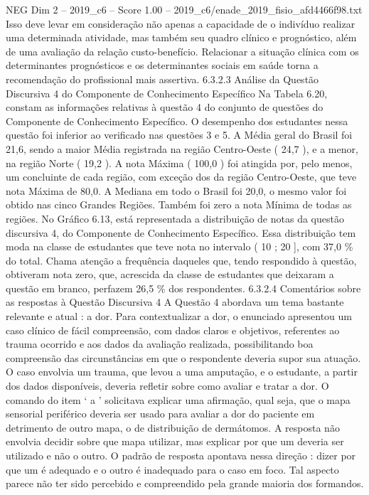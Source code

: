 \begin{textsample}{NEG Dim 2 – 2019\_c6 – Score 1.00 – 2019\_c6/enade\_2019\_fisio\_afd4466f98.txt}
Isso deve levar em consideração não apenas a capacidade de o indivíduo realizar uma determinada atividade, mas também seu quadro clínico e prognóstico, além de uma avaliação da relação custo-benefício.
Relacionar a situação clínica com os determinantes prognósticos e os determinantes sociais em saúde torna a recomendação do profissional mais assertiva. 6.3.2.3 Análise da Questão Discursiva 4 do Componente de Conhecimento Específico Na Tabela 6.20, constam as informações relativas à questão 4 do conjunto de questões do Componente de Conhecimento Específico.
O desempenho dos estudantes nessa questão foi inferior ao verificado nas questões 3 e 5.
A Média geral do Brasil foi 21,6, sendo a maior Média registrada na região Centro-Oeste ( 24,7 ), e a menor, na região Norte ( 19,2 ).
A nota Máxima ( 100,0 ) foi atingida por, pelo menos, um concluinte de cada região, com exceção dos da região Centro-Oeste, que teve nota Máxima de 80,0.
A Mediana em todo o Brasil foi 20,0, o mesmo valor foi obtido nas cinco Grandes Regiões.
Também foi zero a nota Mínima de todas as regiões.
No Gráfico 6.13, está representada a distribuição de notas da questão discursiva 4, do Componente de Conhecimento Específico.
Essa distribuição tem moda na classe de estudantes que teve nota no intervalo ( 10 ; 20 ], com 37,0 \% do total.
Chama atenção a frequência daqueles que, tendo respondido à questão, obtiveram nota zero, que, acrescida da classe de estudantes que deixaram a questão em branco, perfazem 26,5 \% dos respondentes. 6.3.2.4 Comentários sobre as respostas à Questão Discursiva 4 A Questão 4 abordava um tema bastante relevante e atual : a dor.
Para contextualizar a dor, o enunciado apresentou um caso clínico de fácil compreensão, com dados claros e objetivos, referentes ao trauma ocorrido e aos dados da avaliação realizada, possibilitando boa compreensão das circunstâncias em que o respondente deveria supor sua atuação.
O caso envolvia um trauma, que levou a uma amputação, e o estudante, a partir dos dados disponíveis, deveria refletir sobre como avaliar e tratar a dor.
O comando do item ‘ a ’ solicitava explicar uma afirmação, qual seja, que o mapa sensorial periférico deveria ser usado para avaliar a dor do paciente em detrimento de outro mapa, o de distribuição de dermátomos.
A resposta não envolvia decidir sobre que mapa utilizar, mas explicar por que um deveria ser utilizado e não o outro.
O padrão de resposta apontava nessa direção : dizer por que um é adequado e o outro é inadequado para o caso em foco.
Tal aspecto parece não ter sido percebido e compreendido pela grande maioria dos formandos.

\end{textsample}
